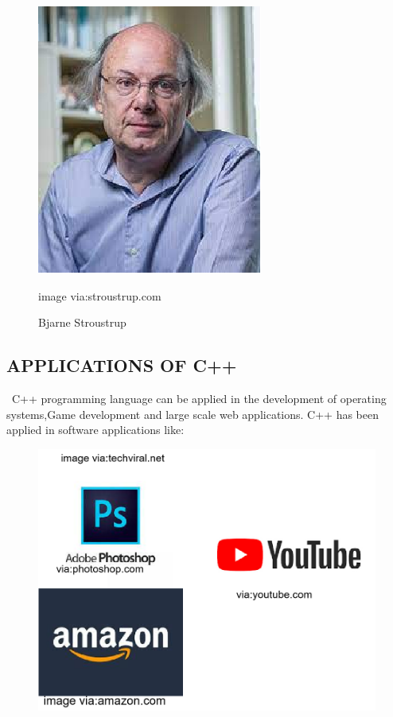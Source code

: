 \documentclass[12pt]{article}
\begin{document}
\begin{figure}[h]
	\includegraphics[width=0.7\linewidth]{screenshot007}
	\caption{Bjarne Stroustrup}{image via:stroustrup.com}
	\label{fig:screenshot007}
\end{figure}

\newpage

\subsection{APPLICATIONS OF C++}
           \ C++ programming language can be applied in the development of operating        systems,Game development and large scale web applications. C++ has been applied in software applications like:
           
\begin{figure}[h]
	\includegraphics[width=0.7\linewidth]{screenshot008}
	\caption{}
	\label{fig:screenshot008}
\end{figure}
\end{document}

